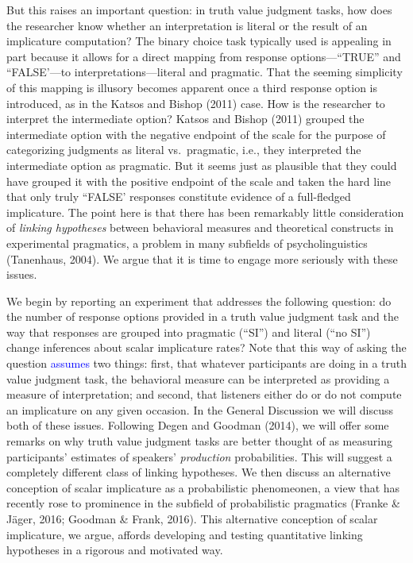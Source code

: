 \documentclass[man]{apa6}
\newcommand{\change}[1]{\textcolor{Blue}{#1}}
\theoremstyle{definition}
\theoremstyle{definition}
\theoremstyle{definition}
\theoremstyle{remark}
\begin{document}
But this raises an important question: in truth value judgment tasks,
how does the researcher know whether an interpretation is literal or the
result of an implicature computation? The binary choice task typically
used is appealing in part because it allows for a direct mapping from
response options---``TRUE'' and ``FALSE'---to interpretations---literal and
pragmatic. That the seeming simplicity of this mapping is illusory
becomes apparent once a third response option is introduced, as in the
Katsos and Bishop (2011) case. How is the researcher to interpret the
intermediate option? Katsos and Bishop (2011) grouped the intermediate
option with the negative endpoint of the scale for the purpose of
categorizing judgments as literal vs.~pragmatic, i.e., they interpreted
the intermediate option as pragmatic. But it seems just as plausible
that they could have grouped it with the positive endpoint of the scale
and taken the hard line that only truly ``FALSE' responses constitute
evidence of a full-fledged implicature. The point here is that there has
been remarkably little consideration of \emph{linking hypotheses}
between behavioral measures and theoretical constructs in experimental
pragmatics, a problem in many subfields of psycholinguistics (Tanenhaus,
2004). We argue that it is time to engage more seriously with these
issues.

We begin by reporting an experiment that addresses the following
question: do the number of response options provided in a truth value
judgment task and the way that responses are grouped into pragmatic
(\enquote{SI}) and literal (\enquote{no SI}) change inferences about
scalar implicature rates? Note that this way of asking the question
\change{assumes} two things: first, that whatever participants are doing in a
truth value judgment task, the behavioral measure can be interpreted as
providing a measure of interpretation; and second, that listeners either
do or do not compute an implicature on any given occasion. In the
General Discussion we will discuss both of these issues.
Following Degen and Goodman (2014), we will offer some remarks on why
truth value judgment tasks are better thought of as measuring
participants' estimates of speakers' \emph{production} probabilities.
This will suggest a completely different class of linking hypotheses.
We then discuss an alternative conception of scalar implicature as a
probabilistic phenomeonen, a view that has recently rose to prominence
in the subfield of probabilistic pragmatics (Franke \& Jäger, 2016;
Goodman \& Frank, 2016). This alternative conception of scalar
implicature, we argue, affords developing and testing quantitative
linking hypotheses in a rigorous and motivated way.
\end{document}
